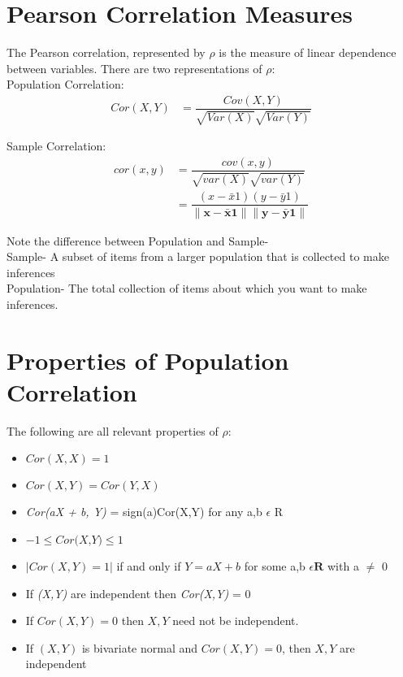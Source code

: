 \documentclass[11pt]{article}
\begin{document}
\section{Pearson Correlation Measures}

The Pearson correlation, represented by \(\rho\) is the measure of linear dependence between variables.
There are two representations of \(\rho\): \\

Population Correlation:
\begin{align}
Cor(X,Y)
&= \dfrac{Cov(X,Y)}{\sqrt{Var(X)}\sqrt{Var(Y)}}
\end{align}

Sample Correlation:
\begin{align}
cor(x,y)
&= \dfrac{cov(x,y)}{\sqrt{var(X)}\sqrt{var(Y)}} \\
&= \dfrac{(x - \bar{x}1)(y - \bar{y}1)}{\| \mathbf{x - \bar{x}1} \|\| \mathbf{y - \bar{y}1} \|}
\end{align}

Note the difference between Population and Sample- \\
Sample- A subset of items from a larger population that is collected to make inferences \\
Population- The total collection of items about which you want to make inferences.



\section{Properties of Population Correlation}
The following are all relevant properties of \(\rho\):

\begin{itemize}
\item $Cor(X,X) = 1$
\item $Cor(X,Y) = Cor(Y,X)$
\item \textit{Cor(aX + b, Y)} = sign(a)Cor(X,Y) for any a,b $\epsilon$ R
\item $-1 \leq \textit{Cor(X,Y)}  \leq 1 $
\item $|Cor(X,Y)  =  1|$ if and only if $Y = aX + b$ for some a,b $\epsilon \mathbf{R}$ with a $\neq$ 0 
\item If  \textit{(X,Y)} are independent then \textit{Cor(X,Y)} = 0
\item If $Cor(X,Y) = 0$ then $X,Y$ need not be independent.
\item If $(X,Y)$ is bivariate normal and $Cor(X,Y) = 0$, then $X,Y$ are independent


\end{itemize}
\end{document}
